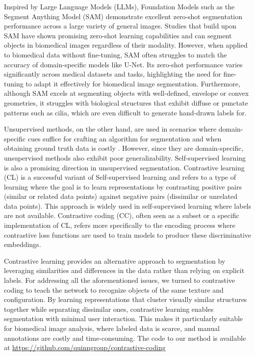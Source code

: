 \documentclass[./dissertation.tex]{subfiles}
\begin{document}
\label{cc:SAM}
Inspired by Large Language Models (LLMs), Foundation Models such as the Segment Anything Model (SAM) \cite{kirillov2023segment} demonstrate excellent zero-shot segmentation performance across a large variety of general images. Studies that build upon SAM \cite{kim2024medivistamedicalvideosegmentation} have shown promising zero-shot learning capabilities and can segment objects in biomedical images regardless of their modality. However, when applied to biomedical data without fine-tuning, SAM often struggles to match the accuracy of domain-specific models like U-Net. Its zero-shot performance varies significantly across medical datasets and tasks, highlighting the need for fine-tuning to adapt it effectively for biomedical image segmentation. Furthermore, although SAM excels at segmenting objects with well-defined, envelope or convex geometries, it struggles with biological structures that exhibit diffuse or punctate patterns such as cilia, which are even difficult to generate hand-drawn labels for.

\label{cc:Unsupervised}
Unsupervised methods, on the other hand, are used in scenarios where domain-specific cues suffice for crafting an algorithm for segmentation and when obtaining ground truth data is costly \cite{vaezi2024training}. However, since they are domain-specific, unsupervised methods also exhibit poor generalizability. Self-supervised learning is also a promising direction in unsupervised segmentation. Contrastive learning (CL) is a successful variant of Self-supervised learning and refers to a type of learning where the goal is to learn representations by contrasting positive pairs (similar or related data points) against negative pairs (dissimilar or unrelated data points). This approach is widely used in self-supervised learning where labels are not available. Contrastive coding (CC), often seen as a subset or a specific implementation of CL, refers more specifically to the encoding process where contrastive loss functions are used to train models to produce these discriminative embeddings.

\label{cc:Contrastive}
Contrastive learning provides an alternative approach to segmentation by leveraging similarities and differences in the data rather than relying on explicit labels. For addressing all the aforementioned issues, we turned to contrastive coding to teach the network to recognize objects of the same texture and configuration. By learning representations that cluster visually similar structures together while separating dissimilar ones, contrastive learning enables segmentation with minimal user interaction. This makes it particularly suitable for biomedical image analysis, where labeled data is scarce, and manual annotations are costly and time-consuming. The code to our method is available at \url{https://github.com/quinngroup/contrastive-coding}
\end{document}
